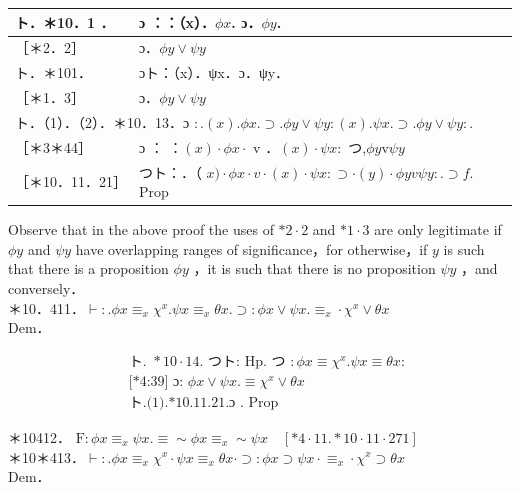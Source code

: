 \documentclass[10pt]{article}
\begin{document}
\begin{center}
\begin{tabular}{|l|l|}
\hline
ト．＊10．1 ． & ɔ ：：（x）．$\phi x$. ɔ．$\phi y$. \\
\hline
［＊2．2］ & ɔ．$\phi y \vee \psi y$ \\
\hline
ト．＊101． & ɔト：（x）．ψx．ɔ．ψy． \\
\hline
［＊1．3］ & ɔ．$\phi y \vee \psi y$ \\
\hline
\multicolumn{2}{|l|}{ト．（1）．（2）．＊10．13．ɔ $: .(x) . \phi x . \supset . \phi y \vee \psi y:(x) . \psi x . \supset . \phi y \vee \psi y:$.} \\
\hline
［＊3＊44］ & ɔ ： ：$(x) \cdot \phi x \cdot$ v ．$(x) \cdot \psi x:$ つ,$\phi y \mathrm{v} \psi y$ \\
\hline
［＊10．11．21］ & つト：．（ $x) \cdot \phi x \cdot v \cdot(x) \cdot \psi x: \supset \cdot(y) \cdot \phi y v \psi y: . \supset f$. Prop \\
\hline
\end{tabular}
\end{center}

Observe that in the above proof the uses of $* 2 \cdot 2$ and $* 1 \cdot 3$ are only legitimate if $\phi y$ and $\psi y$ have overlapping ranges of significance，for otherwise，if $y$ is such that there is a proposition $\phi y$ ，it is such that there is no proposition $\psi y$ ，and conversely．\\
＊10．411．$\vdash: . \phi x \equiv_{x} \chi^{x} . \psi x \equiv_{x} \theta x . \supset: \phi x \vee \psi x . \equiv_{x} \cdot \chi^{x} \vee \theta x$\\
Dem．


\begin{align*}
& \text { ト. } * 10 \cdot 14 . \text { つト: } \mathrm{Hp} . \text { つ }: \phi x \equiv \chi^{x} . \psi x \equiv \theta x: \\
& \text { [*4:39] ɔ: } \phi x \vee \psi x . \equiv \chi^{x} \vee \theta x  \tag{1}\\
& \text { ト.(1).*10.11.21.ɔ . Prop }
\end{align*}


＊10412． $\mathrm{F}: \phi x \equiv_{x} \psi x . \equiv \sim \phi x \equiv_{x} \sim \psi x \quad[* 4 \cdot 11 . * 10 \cdot 11 \cdot 271]$\\
＊10＊413．$\vdash: . \phi x \equiv_{x} \chi^{x} \cdot \psi x \equiv_{x} \theta x \cdot \supset: \phi x \supset \psi x \cdot \equiv_{x} \cdot \chi^{x} \supset \theta x$\\
Dem．
\end{document}
